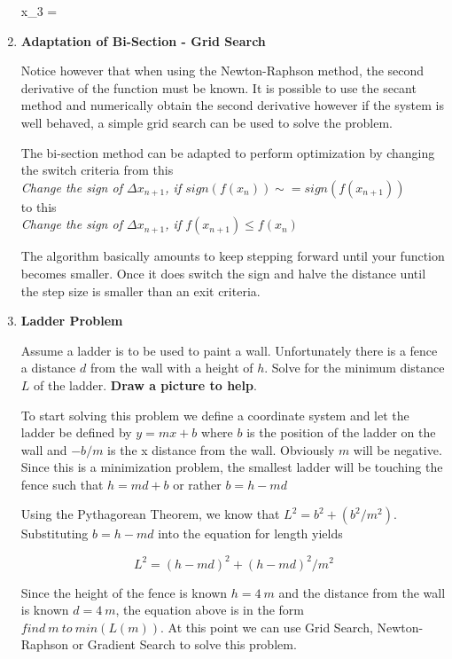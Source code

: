 \begin{enumerate}
\beq
x_3 =
\eeq

\item {\bf Adaptation of Bi-Section - Grid Search}

  Notice however that when using the Newton-Raphson method, the
  second derivative of the function must be known. It is possible to
  use the secant method and numerically obtain the second derivative
  however if the system is well behaved, a simple grid search can be
  used to solve the problem. 

  The bi-section method can be adapted to perform optimization by
  changing the switch criteria from this
  \ \\

  {\it Change the sign of $\Delta x_{n+1}$, if $sign(f(x_n)) \sim=
    sign(f(x_{n+1}))$}
  \ \\

  to this
  \ \\ 

  {\it Change the sign of $\Delta x_{n+1}$, if $f(x_{n+1}) \le
    f(x_{n})$}

  The algorithm basically amounts to keep stepping forward until your
  function becomes smaller. Once it does switch the sign and halve the
  distance until the step size is smaller than an exit criteria.

\item {\bf Ladder Problem}

  Assume a ladder is to be used to paint a wall. Unfortunately there
  is a fence a distance $d$ from the wall with a height of $h$. Solve
  for the minimum distance $L$ of the ladder. {\bf Draw a picture to
    help}. 

  To start solving this problem we define a coordinate system and let
  the ladder be defined by $y = mx+b$ where $b$ is the position of the
  ladder on the wall and $-b/m$ is the x distance from the
  wall. Obviously $m$ will be negative. Since this is a minimization
  problem, the smallest ladder will be touching the fence such that $h
  = md+b$ or rather $b = h - md$

  Using the Pythagorean Theorem, we know that $L^2 = b^2 +
  (b^2/m^2)$. Substituting $b=h-md$ into the equation for length
  yields

  \begin{equation}
    L^2 = (h-md)^2 + (h-md)^2/m^2
  \end{equation}

  Since the height of the fence is known $h=4~m$ and the distance from
  the wall is known $d = 4~m$, the equation above is in the form
  $find~m~to~min(L(m))$. At this point we can use Grid Search,
  Newton-Raphson or Gradient Search to solve this problem.

\end{enumerate}

